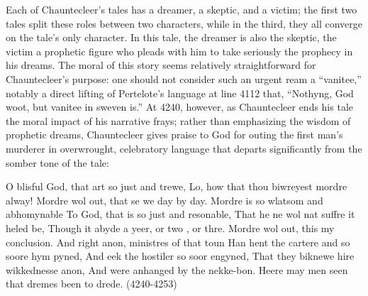 \documentclass[
]{article}
\begin{document}
Each of Chauntecleer's tales has a dreamer, a skeptic, and a victim; the
first two tales split these roles between two characters, while in the
third, they all converge on the tale's only character. In this tale, the
dreamer is also the skeptic, the victim a prophetic figure who pleads
with him to take seriously the prophecy in his dreams. The moral of this
story seems relatively straightforward for Chauntecleer's purpose: one
should not consider such an urgent ream a ``vanitee,'' notably a direct
lifting of Pertelote's language at line 4112 that, ``Nothyng, God woot,
but vanitee in sweven is.'' At 4240, however, as Chauntecleer ends his
tale the moral impact of his narrative frays; rather than emphasizing
the wisdom of prophetic dreams, Chauntecleer gives praise to God for
outing the first man's murderer in overwrought, celebratory language
that departs significantly from the somber tone of the tale:

O blisful God, that art so just and trewe, Lo, how that thou biwreyest
mordre alway! Mordre wol out, that se we day by day. Mordre is so
wlatsom and abhomynable To God, that is so just and resonable, That he
ne wol nat suffre it heled be, Though it abyde a yeer, or two , or thre.
Mordre wol out, this my conclusion. And right anon, ministres of that
toun Han hent the cartere and so soore hym pyned, And eek the hostiler
so soor engyned, That they biknewe hire wikkednesse anon, And were
anhanged by the nekke-bon. Heere may men seen that dremes been to drede.
(4240-4253)
\end{document}
